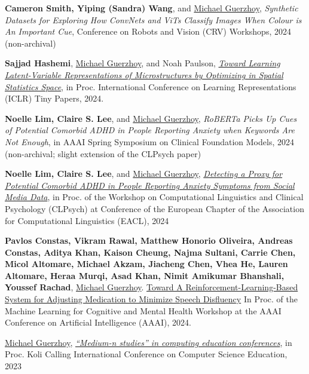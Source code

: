 \documentclass[letterpaper,11pt]{article}
\begin{document}
\begin{revnumerate}
\item \textbf{Cameron Smith, Yiping (Sandra) Wang}, and \underline{Michael Guerzhoy}, \textit{Synthetic Datasets for Exploring How ConvNets and ViTs Classify Images When Colour is An Important Cue}, Conference on Robots and Vision (CRV) Workshops, 2024 (non-archival)

\item \textbf{Sajjad Hashemi}, \underline{Michael Guerzhoy}, and Noah Paulson, \href{https://arxiv.org/abs/2402.11103}{\textit{Toward Learning Latent-Variable Representations of Microstructures by Optimizing in Spatial Statistics Space}}, in Proc. International Conference on Learning Representations (ICLR) Tiny Papers, 2024.

\item \textbf{Noelle Lim, Claire S. Lee}, and \underline{Michael Guerzhoy}, \textit{RoBERTa Picks Up Cues of Potential Comorbid ADHD in People Reporting Anxiety when Keywords Are Not Enough}, in AAAI Spring Symposium on Clinical Foundation Models, 2024 (non-archival; slight extension of the CLPsych paper)

\item \textbf{Noelle Lim, Claire S. Lee}, and \underline{Michael Guerzhoy}, \href{https://aclanthology.org/2024.clpsych-1.14/}{\textit{Detecting a Proxy for Potential Comorbid ADHD in People Reporting Anxiety Symptoms from Social Media Data}}, in Proc. of the Workshop on Computational Linguistics and Clinical Psychology (CLPsych) at Conference of the European Chapter
of the Association for Computational Linguistics (EACL),  2024
\item \textbf{Pavlos Constas, Vikram Rawal, Matthew Honorio Oliveira, Andreas Constas, Aditya Khan, Kaison Cheung, Najma Sultani, Carrie Chen, Micol Altomare, Michael Akzam, Jiacheng Chen, Vhea He, Lauren Altomare, Heraa Murqi, Asad Khan, Nimit Amikumar Bhanshali, Youssef Rachad}, \underline{Michael Guerzhoy}. \href{https://ceur-ws.org/Vol-3649/Paper23.pdf}{Toward A Reinforcement-Learning-Based System for Adjusting Medication to Minimize Speech Disfluency}
In Proc. of the Machine Learning for Cognitive and Mental Health Workshop at the AAAI Conference on Artificial Intelligence (AAAI), 2024.


\item \underline{Michael Guerzhoy}, \href{https://dl.acm.org/doi/10.1145/3631802.3631854}{\textit{``Medium-n studies'' in computing education conferences}}, in Proc. Koli Calling International Conference on Computer Science Education, 2023 


\end{revnumerate}
\end{document}
